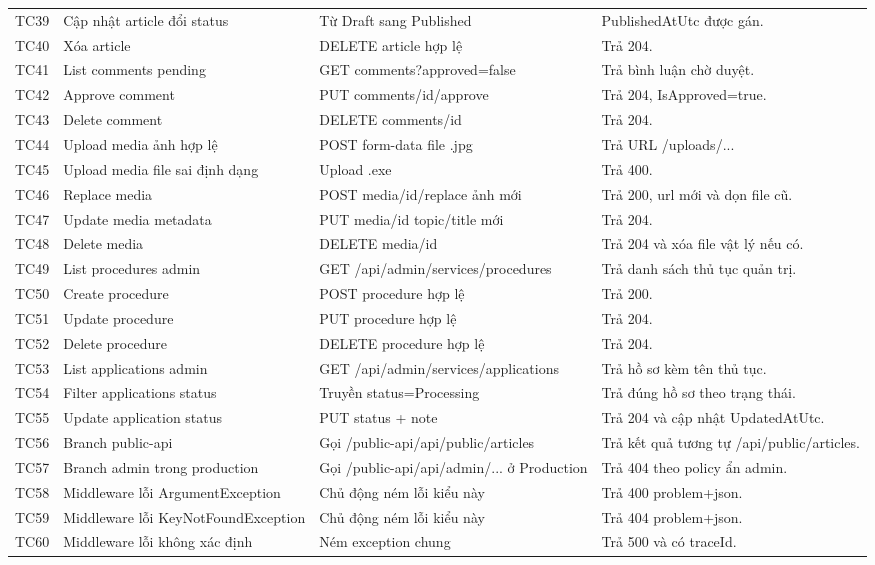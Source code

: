 \documentclass[12pt,a4paper]{article}
\begin{document}
\begin{longtable}{p{1.2cm}p{3.2cm}p{4.7cm}p{4.2cm}}
TC39 & Cập nhật article đổi status & Từ Draft sang Published & PublishedAtUtc được gán. \\
TC40 & Xóa article & DELETE article hợp lệ & Trả 204. \\
TC41 & List comments pending & GET comments?approved=false & Trả bình luận chờ duyệt. \\
TC42 & Approve comment & PUT comments/{id}/approve & Trả 204, IsApproved=true. \\
TC43 & Delete comment & DELETE comments/{id} & Trả 204. \\
TC44 & Upload media ảnh hợp lệ & POST form-data file .jpg & Trả URL /uploads/... \\
TC45 & Upload media file sai định dạng & Upload .exe & Trả 400. \\
TC46 & Replace media & POST media/{id}/replace ảnh mới & Trả 200, url mới và dọn file cũ. \\
TC47 & Update media metadata & PUT media/{id} topic/title mới & Trả 204. \\
TC48 & Delete media & DELETE media/{id} & Trả 204 và xóa file vật lý nếu có. \\
TC49 & List procedures admin & GET /api/admin/services/procedures & Trả danh sách thủ tục quản trị. \\
TC50 & Create procedure & POST procedure hợp lệ & Trả 200. \\
TC51 & Update procedure & PUT procedure hợp lệ & Trả 204. \\
TC52 & Delete procedure & DELETE procedure hợp lệ & Trả 204. \\
TC53 & List applications admin & GET /api/admin/services/applications & Trả hồ sơ kèm tên thủ tục. \\
TC54 & Filter applications status & Truyền status=Processing & Trả đúng hồ sơ theo trạng thái. \\
TC55 & Update application status & PUT status + note & Trả 204 và cập nhật UpdatedAtUtc. \\
TC56 & Branch public-api & Gọi /public-api/api/public/articles & Trả kết quả tương tự /api/public/articles. \\
TC57 & Branch admin trong production & Gọi /public-api/api/admin/... ở Production & Trả 404 theo policy ẩn admin. \\
TC58 & Middleware lỗi ArgumentException & Chủ động ném lỗi kiểu này & Trả 400 problem+json. \\
TC59 & Middleware lỗi KeyNotFoundException & Chủ động ném lỗi kiểu này & Trả 404 problem+json. \\
TC60 & Middleware lỗi không xác định & Ném exception chung & Trả 500 và có traceId. \\
\bottomrule
\end{longtable}
\end{document}
